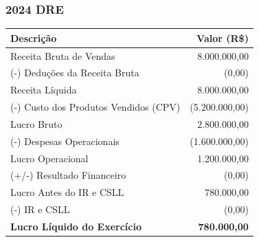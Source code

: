 \subsubsection{2024 DRE}
 \begin{tabular}{p{10cm} r}                                                     
 \toprule                                                                       
 \textbf{Descrição} & \textbf{Valor (R\$)} \\                                   
 \midrule                                                                       
 Receita Bruta de Vendas & 8.000.000,00 \\                                        
 (-) Deduções da Receita Bruta & (0,00) \\                                 
 \midrule                                                                       
 Receita Líquida & 8.000.000,00 \\                                                 
 (-) Custo dos Produtos Vendidos (CPV) & (5.200.000,00) \\                         
 \midrule                                                                       
 Lucro Bruto & 2.800.000,00 \\                                                     
 (-) Despesas Operacionais & (1.600.000,00) \\                                     
 \midrule                                                                       
 Lucro Operacional & 1.200.000,00 \\                                               
 (+/-) Resultado Financeiro & (0,00) \\                                     
 \midrule                                                                       
 Lucro Antes do IR e CSLL & 780.000,00 \\                                        
 (-) IR e CSLL & (0,00) \\                                                  
 \midrule                                                                       
 \textbf{Lucro Líquido do Exercício} & \textbf{780.000,00} \\                    
 \bottomrule                                                                    
 \end{tabular}                                                                  
